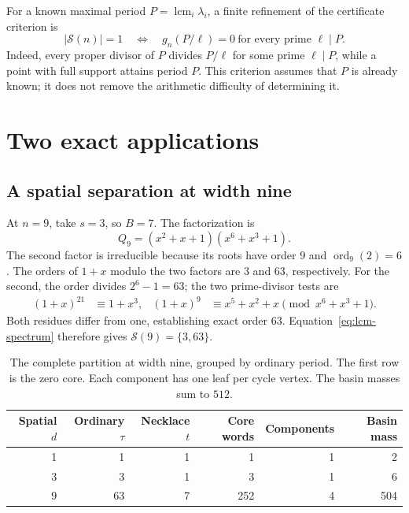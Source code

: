 \documentclass[11pt]{article}
\theoremstyle{definition}
\theoremstyle{remark}
\numberwithin{equation}{section}
\newcommand{\Spec}{\mathcal S}
\DeclareMathOperator{\ord}{ord}
\DeclareMathOperator{\lcm}{lcm}
\begin{document}
For a known maximal period $P=\lcm_i\lambda_i$, a finite refinement of
the certificate criterion is
\begin{equation}\label{eq:prime-tests}
 |\Spec(n)|=1
 \quad\Longleftrightarrow\quad
 g_n(P/\ell)=0\ \text{for every prime }\ell\mid P.
\end{equation}
Indeed, every proper divisor of $P$ divides $P/\ell$ for some prime
$\ell\mid P$, while a point with full support attains period $P$.
This criterion assumes that $P$ is already known; it does not remove
the arithmetic difficulty of determining it.

\section{Two exact applications}\label{sec:examples}

\subsection{A spatial separation at width nine}

At $n=9$, take $s=3$, so $B=7$. The factorization is
\[
 Q_9=(x^2+x+1)(x^6+x^3+1).
\]
The second factor is irreducible because its roots have order $9$ and
$\ord_9(2)=6$. The orders of $1+x$ modulo the two factors are $3$ and
$63$, respectively. For the second, the order divides $2^6-1=63$;
the two prime-divisor tests are
\begin{align*}
 (1+x)^{21}&\equiv 1+x^3,&
 (1+x)^9&\equiv x^5+x^2+x
 \pmod{x^6+x^3+1}.
\end{align*}
Both residues differ from one, establishing exact order $63$.
Equation~\eqref{eq:lcm-spectrum} therefore gives
$\Spec(9)=\{3,63\}$.

\begin{table}[htbp]
\centering
\small
\renewcommand{\arraystretch}{1.3}
\begin{tabular}{@{}rrrrrr@{}}
\toprule
Spatial $d$ & Ordinary $\tau$ & Necklace $t$ & Core words & Components & Basin mass\\
\midrule
1 & 1 & 1 & 1 & 1 & 2\\
3 & 3 & 1 & 3 & 1 & 6\\
9 & 63 & 7 & 252 & 4 & 504\\
\bottomrule
\end{tabular}
\caption{The complete partition at width nine, grouped by ordinary period.
The first row is the zero core. Each component has one leaf per cycle
vertex. The basin masses sum to $512$.}
\label{tab:nine}
\end{table}
\end{document}
